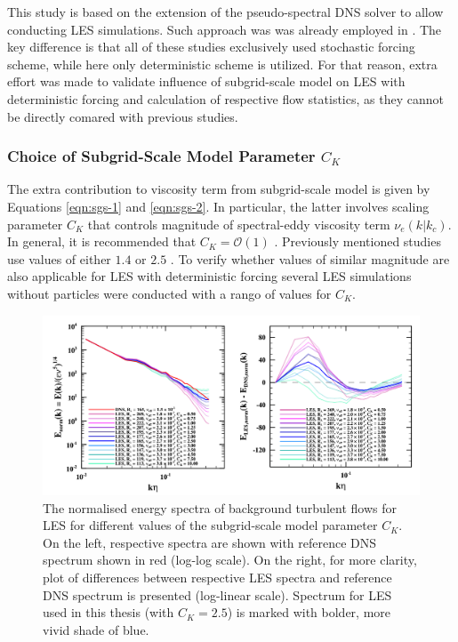 \documentclass{pracamgren}
\begin{document}
This study is based on the extension of the pseudo-spectral DNS solver to allow conducting LES simulations.
Such approach was was already employed in \textcite{Yang2008,Jin2010,Rosa2017}.
The key difference is that all of these studies exclusively used stochastic forcing scheme, while here only deterministic scheme is utilized.
For that reason, extra effort was made to validate influence of subgrid-scale model on LES with deterministic forcing and calculation of respective flow statistics, as they cannot be directly comared with previous studies.

\subsubsection{Choice of Subgrid-Scale Model Parameter $C_K$}

The extra contribution to viscosity term from subgrid-scale model is given by Equations \ref{eqn:sgs-1} and \ref{eqn:sgs-2}.
In particular, the latter involves scaling parameter $C_K$ that controls magnitude of spectral-eddy viscosity term $\nu_{e}(k|k_c)$.
In general, it is recommended that $C_K = \mathcal{O}(1)$ \parencite{Chollet1981}.
Previously mentioned studies use values of either $1.4$ \parencite{Yang2008} or $2.5$ \parencite{Jin2010,Rosa2017}.
To verify whether values of similar magnitude are also applicable for LES with deterministic forcing several LES simulations without particles were conducted with a rango of values for $C_K$.

\begin{figure}[h]
\centering
\includegraphics[width=13.5cm]{figures/B-01_sgsspec.pdf}
\caption{
The normalised energy spectra of background turbulent flows for LES for different values of the subgrid-scale model parameter $C_K$. 
On the left, respective spectra are shown with reference DNS spectrum shown in red (log-log scale).
On the right, for more clarity, plot of differences between respective LES spectra and reference DNS spectrum is presented (log-linear scale).
Spectrum for LES used in this thesis (with $C_K=2.5$) is marked with bolder, more vivid shade of blue.
}
\label{fig:sgsspec}
\end{figure}
\end{document}

